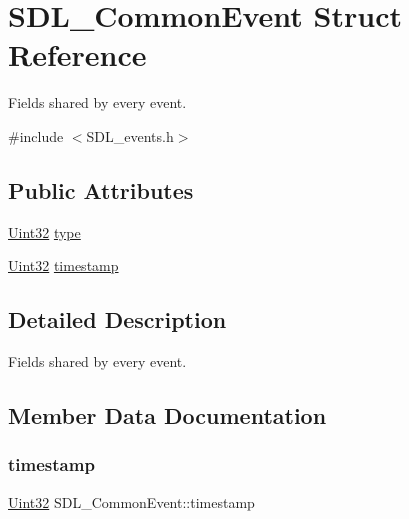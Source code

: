 \hypertarget{struct_s_d_l___common_event}{}\section{S\+D\+L\+\_\+\+Common\+Event Struct Reference}
\label{struct_s_d_l___common_event}


Fields shared by every event.  




{\ttfamily \#include $<$S\+D\+L\+\_\+events.\+h$>$}

\subsection*{Public Attributes}
\begin{DoxyCompactItemize}
\item 
\mbox{\hyperlink{_s_d_l__stdinc_8h_add440eff171ea5f55cb00c4a9ab8672d}{Uint32}} \mbox{\hyperlink{struct_s_d_l___common_event_a4ecd888325355321b42b2e2956f27453}{type}}
\item 
\mbox{\hyperlink{_s_d_l__stdinc_8h_add440eff171ea5f55cb00c4a9ab8672d}{Uint32}} \mbox{\hyperlink{struct_s_d_l___common_event_a7d9046abb021ffc88dd5d32978289e65}{timestamp}}
\end{DoxyCompactItemize}


\subsection{Detailed Description}
Fields shared by every event. 

\subsection{Member Data Documentation}
\mbox{\label{struct_s_d_l___common_event_a7d9046abb021ffc88dd5d32978289e65}} 
\subsubsection{\texorpdfstring{timestamp}{timestamp}}
{\footnotesize\ttfamily \mbox{\hyperlink{_s_d_l__stdinc_8h_add440eff171ea5f55cb00c4a9ab8672d}{Uint32}} S\+D\+L\+\_\+\+Common\+Event\+::timestamp}

